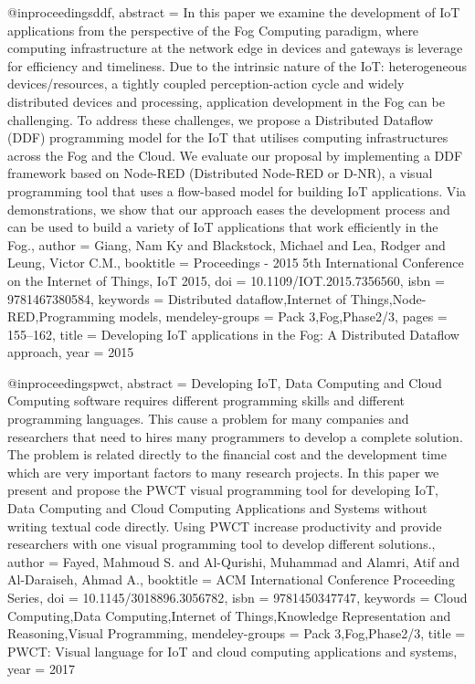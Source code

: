@inproceedings{ddf,
    abstract = {In this paper we examine the development of IoT applications from the perspective of the Fog Computing paradigm, where computing infrastructure at the network edge in devices and gateways is leverage for efficiency and timeliness. Due to the intrinsic nature of the IoT: heterogeneous devices/resources, a tightly coupled perception-action cycle and widely distributed devices and processing, application development in the Fog can be challenging. To address these challenges, we propose a Distributed Dataflow (DDF) programming model for the IoT that utilises computing infrastructures across the Fog and the Cloud. We evaluate our proposal by implementing a DDF framework based on Node-RED (Distributed Node-RED or D-NR), a visual programming tool that uses a flow-based model for building IoT applications. Via demonstrations, we show that our approach eases the development process and can be used to build a variety of IoT applications that work efficiently in the Fog.},
    author = {Giang, Nam Ky and Blackstock, Michael and Lea, Rodger and Leung, Victor C.M.},
    booktitle = {Proceedings - 2015 5th International Conference on the Internet of Things, IoT 2015},
    doi = {10.1109/IOT.2015.7356560},
    isbn = {9781467380584},
    keywords = {Distributed dataflow,Internet of Things,Node-RED,Programming models},
    mendeley-groups = {Pack 3,Fog,Phase2/3},
    pages = {155--162},
    title = {{Developing IoT applications in the Fog: A Distributed Dataflow approach}},
    year = {2015}
}

@inproceedings{pwct,
    abstract = {Developing IoT, Data Computing and Cloud Computing software requires different programming skills and different programming languages. This cause a problem for many companies and researchers that need to hires many programmers to develop a complete solution. The problem is related directly to the financial cost and the development time which are very important factors to many research projects. In this paper we present and propose the PWCT visual programming tool for developing IoT, Data Computing and Cloud Computing Applications and Systems without writing textual code directly. Using PWCT increase productivity and provide researchers with one visual programming tool to develop different solutions.},
    author = {Fayed, Mahmoud S. and Al-Qurishi, Muhammad and Alamri, Atif and Al-Daraiseh, Ahmad A.},
    booktitle = {ACM International Conference Proceeding Series},
    doi = {10.1145/3018896.3056782},
    isbn = {9781450347747},
    keywords = {Cloud Computing,Data Computing,Internet of Things,Knowledge Representation and Reasoning,Visual Programming},
    mendeley-groups = {Pack 3,Fog,Phase2/3},
    title = {{PWCT: Visual language for IoT and cloud computing applications and systems}},
    year = {2017}
}


